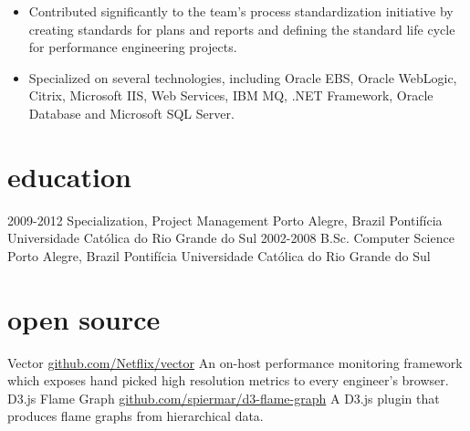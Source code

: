 \begin{entrylist}
{\begin{itemize}
        \item Contributed significantly to the team’s process standardization initiative by creating standards for plans and reports and defining the standard life cycle for performance engineering projects.
        \item Specialized on several technologies, including Oracle EBS, Oracle WebLogic, Citrix, Microsoft IIS, Web Services, IBM MQ, .NET Framework, Oracle Database and Microsoft SQL Server.
      \end{itemize}
    }
\end{entrylist}

\section{education}

\begin{entrylist}
  \entry
    {2009-2012}
    {Specialization, Project Management}
    {Porto Alegre, Brazil}
    {Pontifícia Universidade Católica do Rio Grande do Sul}
  \entry
    {2002-2008}
    {B.Sc. Computer Science}
    {Porto Alegre, Brazil}
    {Pontifícia Universidade Católica do Rio Grande do Sul}
\end{entrylist}

\section{open source}

\begin{entrylist}
  \simpleentry
    {Vector}
    {\href{https://github.com/Netflix/vector}{github.com/Netflix/vector}}
    {An on-host performance monitoring framework which exposes hand picked high resolution metrics to every engineer’s browser.}
  \simpleentry
    {D3.js Flame Graph}
    {\href{https://github.com/spiermar/d3-flame-graph}{github.com/spiermar/d3-flame-graph}}
    {A D3.js plugin that produces flame graphs from hierarchical data.}
\end{entrylist}
